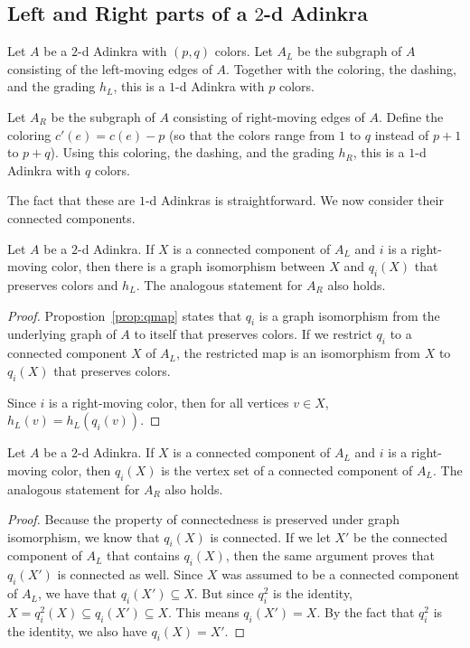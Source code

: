 \subsection{Left and Right parts of a $2$-d Adinkra}
\begin{definition}
Let $A$ be a $2$-d Adinkra with $(p,q)$ colors.  Let $A_L$ be the subgraph of $A$ consisting of the left-moving edges of $A$.  Together with the coloring, the dashing, and the grading $h_L$, this is a $1$-d Adinkra with $p$ colors.

Let $A_R$ be the subgraph of $A$ consisting of right-moving edges of $A$.  Define the coloring $c'(e)=c(e)-p$ (so that the colors range from $1$ to $q$ instead of $p+1$ to $p+q$).  Using this coloring, the dashing, and the grading $h_R$, this is a $1$-d Adinkra with $q$ colors.
\end{definition}
The fact that these are $1$-d Adinkras is straightforward.  We now consider their connected components.

\begin{lem}
\label{lem:qiso}
Let $A$ be a $2$-d Adinkra.  If $X$ is a connected component of $A_L$ and $i$ is a right-moving color, then there is a graph isomorphism between $X$ and $q_i(X)$ that preserves colors and $h_L$.  The analogous statement for $A_R$ also holds.
\end{lem}
\begin{proof}
Propostion~\ref{prop:qmap} states that $q_i$ is a graph isomorphism from the underlying graph of $A$ to itself that preserves colors.  If we restrict  $q_i$ to a connected component $X$ of $A_L$, the restricted map is an isomorphism from $X$ to $q_i(X)$ that preserves colors.

Since $i$ is a right-moving color, then for all vertices $v\in X$, $h_L(v)=h_L(q_i(v))$.
\end{proof}

\begin{lem}
\label{lem:qiconnected}
Let $A$ be a $2$-d Adinkra.  If $X$ is a connected component of $A_L$ and $i$ is a right-moving color, then $q_i(X)$ is the vertex set of a connected component of $A_L$. The analogous statement for $A_R$ also holds.
\end{lem}
\begin{proof}
Because the property of connectedness is preserved under graph isomorphism, we know that $q_i(X)$ is connected.  If we let $X'$ be the connected component of $A_L$ that contains $q_i(X)$, then the same argument proves that $q_i(X')$ is connected as well.  Since $X$ was assumed to be a connected component of $A_L$, we have that $q_i(X')\subseteq X$.  But since $q_i^2$ is the identity, $X=q_i^2(X)\subseteq q_i(X')\subseteq X$.  This means $q_i(X')=X$.  By the fact that $q_i^2$ is the identity, we also have $q_i(X)=X'$.
\end{proof}

